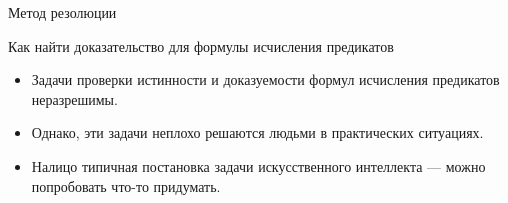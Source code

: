 \documentclass[aspectratio=169]{beamer}
\begin{document}
\newcommand\doubleplus{+\kern-1.3ex+\kern0.8ex}
\newcommand\mdoubleplus{\ensuremath{\mathbin{+\mkern-10mu+}}}


\begin{frame}{}
\begin{center}\LARGE Метод резолюции\end{center}
\end{frame}

\begin{frame}{Как найти доказательство для формулы исчисления предикатов}


\normalsize\flushleft

\begin{itemize}
\item Задачи проверки истинности и доказуемости формул исчисления предикатов неразрешимы.
\item Однако, эти задачи неплохо решаются людьми в практических ситуациях.
\item Налицо типичная постановка задачи искусственного интеллекта --- можно попробовать что-то придумать.
\end{itemize}

\end{frame}
\end{document}
